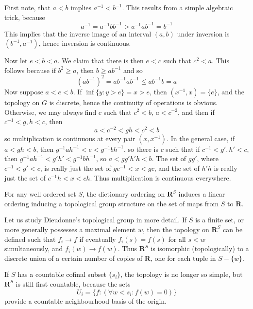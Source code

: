 First note, that $a < b$ implies $a^{-1} < b^{-1}$. This results from a simple algebraic trick, because
%
\[  a^{-1} = a^{-1} b b^{-1} > a^{-1} a b^{-1} = b^{-1} \]
%
This implies that the inverse image of an interval $(a,b)$ under inversion is $(b^{-1}, a^{-1})$, hence inversion is continuous.

Now let $e < b < a$. We claim that there is then $e < c$ such that $c^2 < a$. This follows because if $b^2 \geq a$, then $b \geq ab^{-1}$ and so
%
\[ (ab^{-1})^2 = ab^{-1}ab^{-1} \leq ab^{-1}b = a \]
%
Now suppose $a < e < b$. If $\inf \{ y : y > e \} = x > e$, then $(x^{-1}, x) = \{ e \}$, and the topology on $G$ is discrete, hence the continuity of operations is obvious. Otherwise, we may always find $c$ such that $c^2 < b$, $a < c^{-2}$, and then if $c^{-1} < g,h < c$, then
%
\[ a < c^{-2} < gh < c^2 < b \]
%
so multiplication is continuous at every pair $(x,x^{-1})$. In the general case, if $a < gh < b$, then $g^{-1}ah^{-1} < e < g^{-1}bh^{-1}$, so there is $c$ such that if $c^{-1} < g',h' < c$, then $g^{-1}ah^{-1} < g'h' < g^{-1}bh^{-1}$, so $a < gg'h'h < b$. The set of $gg'$, where $c^{-1} < g' < c$, is really just the set of $gc^{-1} < x < gc$, and the set of $h'h$ is really just the set of $c^{-1}h < x < ch$. Thus multiplication is continuous everywhere.

\begin{example}[Dieudonne]
    For any well ordered set $S$, the dictionary ordering on $\mathbf{R}^S$ induces a linear ordering inducing a topological group structure on the set of maps from $S$ to $\mathbf{R}$.
\end{example}

Let us study Dieudonne's topological group in more detail. If $S$ is a finite set, or more generally possesses a maximal element $w$, then the topology on $\mathbf{R}^S$ can be defined such that $f_i \to f$ if eventually $f_i(s) = f(s)$ for all $s < w$ simultaneously, and $f_i(w) \to f(w)$. Thus $\mathbf{R}^S$ is isomorphic (topologically) to a discrete union of a certain number of copies of $\mathbf{R}$, one for each tuple in $S - \{ w \}$.

If $S$ has a countable cofinal subset $\{ s_i \}$, the topology is no longer so simple, but $\mathbf{R}^S$ is still first countable, because the sets
%
\[ U_i = \{ f : (\forall w < s_i: f(w) = 0) \} \]
%
provide a countable neighbourhood basis of the origin.

